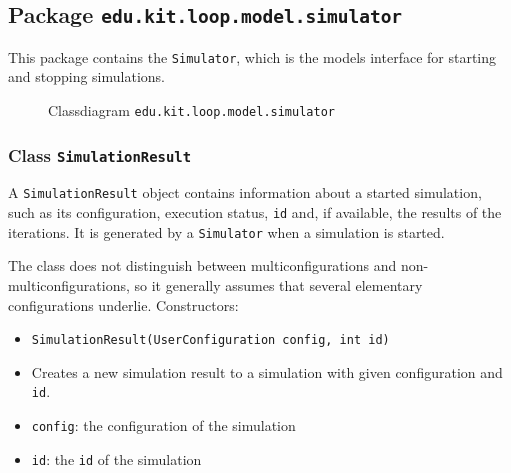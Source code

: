 \documentclass[parskip=full,11pt]{scrartcl}
\begin{document}
\subsection{Package \texttt{edu.kit.loop.model.simulator}}
This package contains the \texttt{Simulator}, which is the models interface for starting and stopping simulations.
\iftrue
\begin{figure}[h]
	\centering
	\fontsize{4.75}{8}\selectfont
	

	\caption{Classdiagram \texttt{edu.kit.loop.model.simulator}}
\end{figure}
\fi
\subsubsection{Class \texttt{SimulationResult}}
A \texttt{SimulationResult} object contains information about a started simulation, such as its configuration, execution status, \texttt{id} and, if available, the results of the iterations. It is generated by a \texttt{Simulator} when a simulation is started.

The class does not distinguish between multiconfigurations and non-multiconfigurations, so it generally assumes that several elementary configurations underlie.
\newpage
Constructors:
\begin{itemize} \itemsep -10pt
	\item \texttt{SimulationResult(UserConfiguration config, int id)}
	\item[] Creates a new simulation result to a simulation with given configuration and \texttt{id}.
	\item[] \texttt{config}: the configuration of the simulation
	\item[] \texttt{id}: the \texttt{id} of the simulation
\end{itemize}
\end{document}
